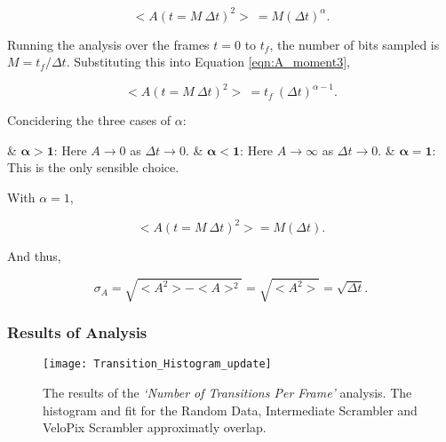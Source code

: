 \begin{description}
					\begin{equation}
						<A(t = M\ \Delta t)^2>\ = M (\Delta t)^\alpha.
						\label{eqn:A_moment3}
					\end{equation}

					Running the analysis over the frames $t = 0$ to $t_f$, the number of bits sampled is $M = {t_f / \Delta t}$. Substituting this into Equation \ref{eqn:A_moment3},

					\begin{equation}
						<A(t = M\ \Delta t)^2>\ = t_f\ (\Delta t)^{\alpha -1}.
					\end{equation}

					Concidering the three cases of $\alpha$:

					\begin{easylist}[itemize]
						& $\bm{\alpha > 1}$: Here $A \to 0$ as $\Delta t \to 0$.
						& $\bm{\alpha < 1}$: Here $A \to \infty$ as $\Delta t \to 0$.
						& $\bm{\alpha = 1}$: This is the only sensible choice.
					\end{easylist}

					With $\alpha =1$,

					\begin{equation}
						<A(t = M\ \Delta t)^2> = M (\Delta t).
					\end{equation}

					And thus,

					\begin{equation}
						\sigma_{A} = \sqrt{<A^2> - <A>^2} = \sqrt{<A^2>} = \sqrt{\Delta t}.
					\end{equation}

			\end{description}	

		\subsubsection{Results of Analysis}
			\begin{figure}[h]
				\texttt{[image: Transition\_Histogram\_update]}
				\caption{The results of the \textit{`Number of Transitions Per Frame'} analysis. The histogram and fit for the Random Data, Intermediate Scrambler and VeloPix Scrambler approximatly overlap.}
				\label{fig:transitions_per_frame}
			\end{figure}
			
